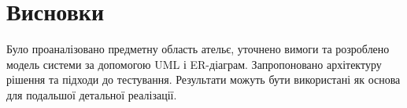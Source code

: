 \section{Висновки}
Було проаналізовано предметну область ательє, уточнено вимоги та розроблено модель системи за допомогою UML і ER-діаграм. Запропоновано архітектуру рішення та підходи до тестування. Результати можуть бути використані як основа для подальшої детальної реалізації.

